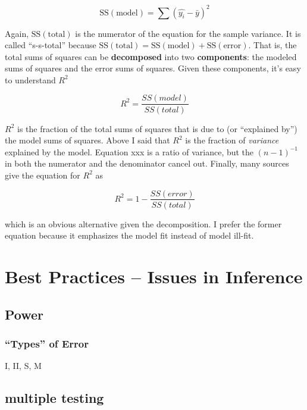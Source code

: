 \documentclass[]{book}
\begin{document}
\begin{equation}
\mathrm{SS(model)} = \sum{(\hat{y_i} - \bar{y})^2}
\end{equation}

Again, \(\mathrm{SS(total)}\) is the numerator of the equation for the sample variance. It is called ``s-s-total'' because \(\mathrm{SS(total)} = \mathrm{SS(model)} + \mathrm{SS(error)}\). That is, the total sums of squares can be \textbf{decomposed} into two \textbf{components}: the modeled sums of squares and the error sums of squares. Given these components, it's easy to understand \(R^2\)

\begin{equation}
R^2 = \frac{SS(model)}{SS(total)}
\end{equation}

\(R^2\) is the fraction of the total sums of squares that is due to (or ``explained by'') the model sums of squares. Above I said that \(R^2\) is the fraction of \emph{variance} explained by the model. Equation xxx is a ratio of variance, but the \((n-1)^{-1}\) in both the numerator and the denominator cancel out. Finally, many sources give the equation for \(R^2\) as

\begin{equation}
R^2 = 1- \frac{SS(error)}{SS(total)}
\end{equation}

which is an obvious alternative given the decomposition. I prefer the former equation because it emphasizes the model fit instead of model ill-fit.

\hypertarget{best-practices-issues-in-inference}{%
\chapter{Best Practices -- Issues in Inference}\label{best-practices-issues-in-inference}}

\hypertarget{power-1}{%
\section{Power}\label{power-1}}

\hypertarget{types-of-error}{%
\subsection{``Types'' of Error}\label{types-of-error}}

I, II, S, M

\hypertarget{multiple-testing}{%
\section{multiple testing}\label{multiple-testing}}
\end{document}
